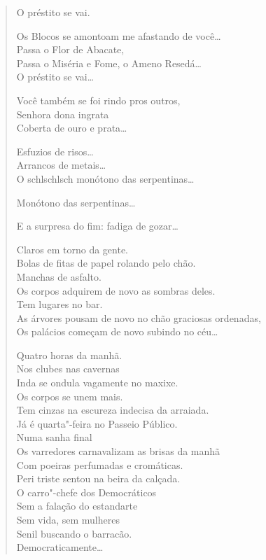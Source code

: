 {\begin{verse}
O préstito se vai.

Os Blocos se amontoam me afastando de você\ldots{}\\
Passa o Flor de Abacate,\\
Passa o Miséria e Fome, o Ameno Resedá\ldots{}\\
O préstito se vai\ldots{}

Você também se foi rindo pros outros,\\
Senhora dona ingrata\\
Coberta de ouro e prata\ldots{}

Esfuzios de risos\ldots{}\\
\quad\quad\quad{}Arrancos de metais\ldots{}\\
O schlschlsch monótono das serpentinas\ldots{}

Monótono das serpentinas\ldots{}

E a surpresa do fim: fadiga de gozar\ldots{}

Claros em torno da gente.\\
Bolas de fitas de papel rolando pelo chão.\\
Manchas de asfalto.\\
Os corpos adquirem de novo as sombras deles.\\
Tem lugares no bar.\\
As árvores pousam de novo no chão graciosas ordenadas,\\
Os palácios começam de novo subindo no céu\ldots{}

Quatro horas da manhã.\\
Nos clubes nas cavernas\\
Inda se ondula vagamente no maxixe.\\
Os corpos se unem mais.\\
Tem cinzas na escureza indecisa da arraiada.\\
Já é quarta"-feira no Passeio Público.\\
Numa sanha final\\
Os varredores carnavalizam as brisas da manhã\\
Com poeiras perfumadas e cromáticas.\\
Peri triste sentou na beira da calçada.\\
O carro"-chefe dos Democráticos\\
Sem a falação do estandarte\\
Sem vida, sem mulheres\\
Senil buscando o barracão.\\
Democraticamente\ldots{}


\end{verse}}
